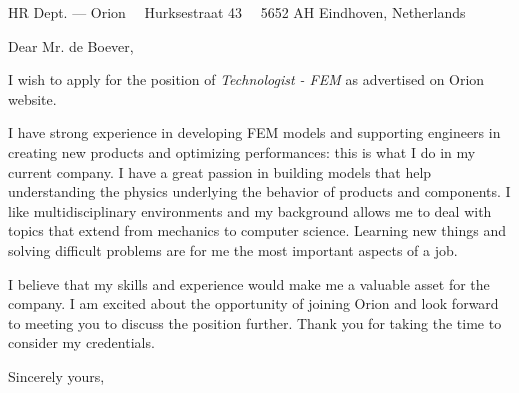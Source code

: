 \documentclass{scrlttr2}
\renewcommand{\\}{\ {\large\textperiodcentered}\ }
\begin{document}

\begin{letter}{ %
HR Dept. --- Orion\\
Hurksestraat 43\\
5652 AH Eindhoven, Netherlands
}


\opening{Dear Mr. de Boever,}

I wish to apply for the position of \emph{Technologist - FEM} as advertised on Orion website.\\

I have strong experience in developing FEM models and supporting engineers in creating new products and optimizing performances: this is what I do in my current company. I have a great passion in building models that help understanding the physics underlying the  behavior of products and components. I like multidisciplinary environments and my background allows me to deal with topics that extend from mechanics to computer science. Learning new things and solving difficult problems are for me the most important aspects of a job.\\

I believe that my skills and experience would make me a valuable asset for the company. 
I am excited about the opportunity of joining Orion and look forward to meeting you to discuss the position further. Thank you for taking the time to consider my credentials.\\


Sincerely yours, \\ \\


\end{letter}
\end{document}
